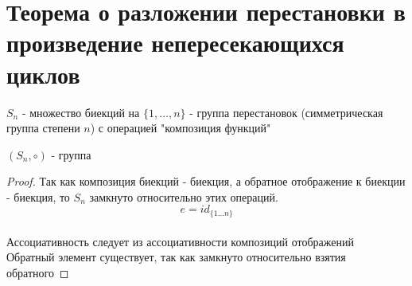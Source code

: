 \section{Теорема о разложении перестановки в произведение непересекающихся циклов}

\begin{Def}
	$S_n$ - множество биекций на $\{1, \dots, n\}$ - группа перестановок (симметрическая группа степени $n$) с операцией "композиция функций"
\end{Def}
\begin{theorem} {}
	$(S_n, \circ)$ - группа
\end{theorem}
\begin{proof}
	Так как композиция биекций - биекция, а обратное отображение к биекции - биекция, то $S_n$ замкнуто относительно этих операций. \\

	$$e = id_{\{1 \dots n \} }$$ \\

	Ассоциативность следует из ассоциативности композиций отображений \\

	Обратный элемент существует, так как замкнуто относительно взятия обратного
\end{proof}


